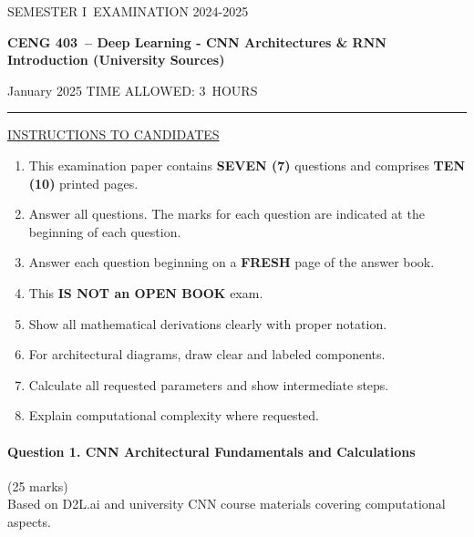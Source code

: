 \documentclass[12pt]{article}
\newcommand{\masunitnumber}{CENG 403}
\newcommand{\examdate}{January 2025}
\newcommand{\academicyear}{2024-2025}
\newcommand{\semester}{I}
\newcommand{\coursename}{Deep Learning - CNN Architectures \& RNN Introduction (University Sources)}
\newcommand{\numberofhours}{3}
\begin{document}
\setlength{\headsep}{5truemm}
\setlength{\headheight}{14.5truemm}
\setlength{\voffset}{-0.45truein}
\renewcommand{\headrulewidth}{0.0pt}
\begin{center}
SEMESTER \semester\ EXAMINATION \academicyear
\end{center}
\begin{center}
{\bf \masunitnumber\ -- \coursename}
\end{center}
\vspace{20truemm}
\noindent \examdate\hspace{45truemm} TIME ALLOWED: \numberofhours\ HOURS
\vspace{19truemm}
\hrule
\vspace{19truemm}
\noindent\underline{INSTRUCTIONS TO CANDIDATES}
\vspace{8truemm}
\begin{enumerate}
\item This examination paper contains {\bf SEVEN (7)} questions and comprises 
{\bf TEN (10)} printed pages.
\item Answer all questions. 
The marks for each question are indicated at the beginning of each question.
\item Answer each question beginning on a {\bf FRESH} page of the answer book.
\item This {\bf IS NOT an OPEN BOOK} exam.
\item Show all mathematical derivations clearly with proper notation.
\item For architectural diagrams, draw clear and labeled components.
\item Calculate all requested parameters and show intermediate steps.
\item Explain computational complexity where requested.
\end{enumerate}
\newpage
\lhead{}
\rhead{\masunitnumber}
\chead{}
\lfoot{}
\cfoot{\thepage}
\rfoot{}
\setlength{\footskip}{45pt}

\paragraph{Question 1. CNN Architectural Fundamentals and Calculations}\hfill (25 marks)\\
Based on D2L.ai and university CNN course materials covering computational aspects.
\end{document}
